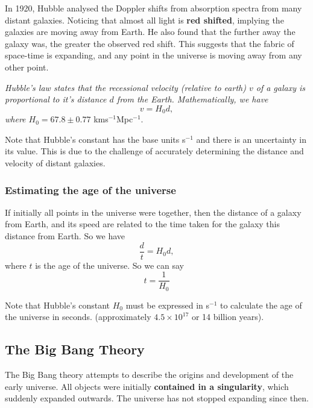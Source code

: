In 1920, Hubble analysed the Doppler shifts from absorption spectra from many distant galaxies. Noticing that almost all light is \textbf{red shifted}, implying the galaxies are moving away from Earth. He also found that the further away the galaxy was, the greater the observed red shift. This suggests that the fabric of space-time is expanding, and any point in the universe is moving away from any other point.  

\begin{theorem}
\textit{Hubble's law states that the recessional velocity (relative to earth) $v$ of a galaxy is proportional to it's distance $d$ from the Earth. Mathematically, we have}
\begin{equation}
    v = H_0 d,
\end{equation}
\textit{where $H_0 = 67.8 \pm 0.77$} kms$^{-1}$Mpc$^{-1}$.
\end{theorem}

Note that Hubble's constant has the base units s$^{-1}$ and there is an uncertainty in its value. This is due to the challenge of accurately determining the distance and velocity of distant galaxies. 

\subsubsection{Estimating the age of the universe}

If initially all points in the universe were together, then the distance of a galaxy from Earth, and its speed are related to the time taken for the galaxy this distance from Earth. So we have
\begin{equation}
    \frac{d}{t} = H_0 d,
\end{equation}
where $t$ is the age of the universe. So we can say
\begin{equation}
    t = \frac{1}{H_0}
\end{equation}

Note that Hubble's constant $H_0$ must be expressed in s$^{-1}$ to calculate the age of the universe in seconds. (approximately $4.5 \times 10^{17}$ or 14 billion years).

\subsection{The Big Bang Theory}

The Big Bang theory attempts to describe the origins and development of the early universe. All objects were initially \textbf{contained in a singularity}, which suddenly expanded outwards. The universe has not stopped expanding since then. 

